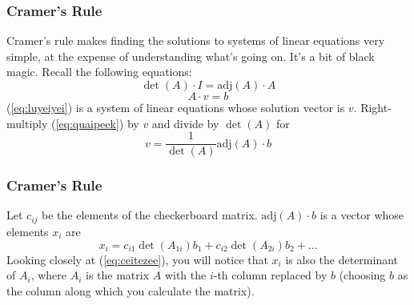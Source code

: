 \documentclass[xcolor=dvipsnames]{beamer}
\begin{document}
\begin{frame}
  \frametitle{Cramer's Rule}
  Cramer's rule makes finding the solutions to systems of linear
  equations very simple, at the expense of understanding what's going
  on. It's a bit of black magic. Recall the following equations:
  \begin{equation}
    \label{eq:quaipeek}
  \det(A)\cdot{}I=\mbox{adj}(A)\cdot{}A
  \end{equation}
  \begin{equation}
    \label{eq:luyeiyei}
    A\cdot{}v=b
  \end{equation}
(\ref{eq:luyeiyei}) is a system of linear equations whose solution
vector is $v$. Right-multiply (\ref{eq:quaipeek}) by $v$ and divide by
$\det(A)$ for
\begin{equation}
  \label{eq:ohghoyae}
  v=\frac{1}{\det(A)}\mbox{adj}(A)\cdot{}b
\end{equation}
\end{frame}

\begin{frame}
  \frametitle{Cramer's Rule}
Let $c_{ij}$ be the elements of the checkerboard matrix.
$\mbox{adj}(A)\cdot{}b$ is a vector whose elements $x_{i}$ are
\begin{equation}
  \label{eq:ceitezee}
  x_{i}=c_{i1}\det(A_{1i})b_{1}+c_{i2}\det(A_{2i})b_{2}+{\ldots}
\end{equation}
Looking closely at (\ref{eq:ceitezee}), you will notice that $x_{i}$
is also the determinant of $A_{i}$, where $A_{i}$ is the matrix $A$
with the $i$-th column replaced by $b$ (choosing $b$ as the column
along which you calculate the matrix).
\end{frame}
\end{document}
